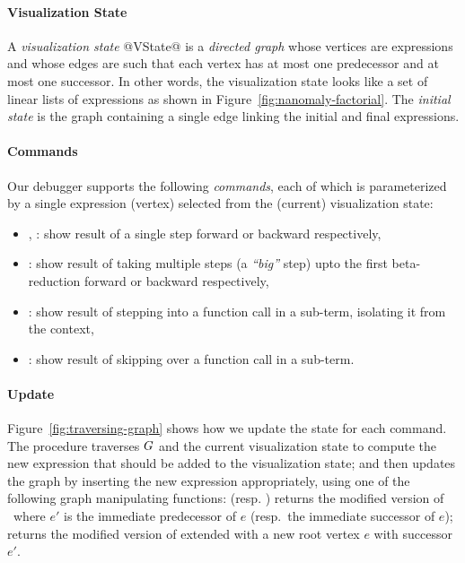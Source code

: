 \paragraph{Visualization State}
%
A \emph{visualization state} @VState@ is a \emph{directed graph}
whose vertices are expressions and whose edges are such
that each vertex has at most one predecessor and at most one
successor. In other words, the visualization state looks
like a set of linear lists of expressions as shown in Figure~\ref{fig:nanomaly-factorial}.
%
The \emph{initial state} is the graph containing a single
edge linking the initial and final expressions.

\paragraph{Commands}
Our debugger supports the following \emph{commands}, each of which
is parameterized by a single expression (vertex) selected from the
(current) visualization state:
%
\begin{itemize}
%
\item \stepforwardsym, \stepbackwardsym:
      show result of a single step forward or backward respectively,
%
\item \jumpforwardsym:
      show result of taking multiple steps (a \emph{``big''} step)
      upto the first beta-reduction forward or backward respectively,
%
\item \stepintosym:
      show result of stepping into a function call in a sub-term,
      isolating it from the context,

\item \stepoversym:
      show result of skipping over a function call in a sub-term.
\end{itemize}

%


\paragraph{Update}
Figure~\ref{fig:traversing-graph} shows how we update the state
for each command.
%
The procedure  traverses $G$
and the current visualization state to compute the new
expression that should be added to the visualization state;
and  then updates the graph
by inserting the new expression appropriately, using
one of the following graph manipulating functions:
%
 (resp. )
returns the modified version of \vstate\ where $e'$ is the
immediate predecessor of $e$ (resp.\ the immediate successor of $e$);
%
 returns the modified version of \vstate
extended with a new root vertex $e$ with successor $e'$.
%

